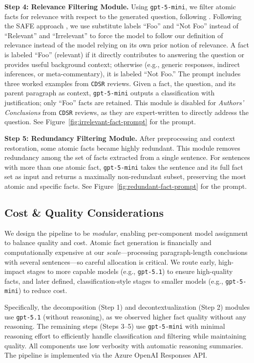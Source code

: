\documentclass{article}
\newcommand{\xhdr}[1]{%
  \noindent\textbf{#1.}
}
\begin{document}
\xhdr{Step 4: Relevance Filtering Module} Using \texttt{gpt-5-mini}, we filter atomic facts for relevance with respect to the generated question, following \cite{liu-etal-2025-verifact, 10.5555/3737916.3740483}. Following the SAFE approach \cite{10.5555/3737916.3740483}, we use substitute labels ``Foo'' and ``Not Foo'' instead of ``Relevant'' and ``Irrelevant'' to force the model to follow our definition of relevance instead of the model relying on its own prior notion of relevance. A fact is labeled ``Foo'' (relevant) if it directly contributes to answering the question or provides useful background context; otherwise (e.g., generic responses, indirect inferences, or meta-commentary), it is labeled ``Not Foo.'' The prompt includes three worked examples from \texttt{CDSR} reviews. Given a fact, the question, and its parent paragraph as context, \texttt{gpt-5-mini} outputs a classification with justification; only ``Foo'' facts are retained. This module is disabled for \textit{Authors’ Conclusions} from \texttt{CDSR} reviews, as they are expert-written to directly address the question. See Figure~\ref{fig:irrelevant-fact-prompt} for the prompt.


\xhdr{Step 5: Redundancy Filtering Module} After preprocessing and context restoration, some atomic facts became highly redundant. This module removes redundancy among the set of facts extracted from a single sentence. For sentences with more than one atomic fact, \texttt{gpt-5-mini} takes the sentence and its full fact set as input and returns a maximally non-redundant subset, preserving the most atomic and specific facts. See Figure~\ref{fig:redundant-fact-prompt} for the prompt.

\subsection{Cost \& Quality Considerations}\label{appendix:afg-cost}

We design the pipeline to be \textit{modular}, enabling per-component model assignment to balance quality and cost. Atomic fact generation is financially and computationally expensive at our \textit{scale}---processing paragraph-length conclusions with several sentences---so careful allocation is critical. We route early, high-impact stages to more capable models (e.g., \texttt{gpt-5.1}) to ensure high-quality facts, and later defined, classification-style stages to smaller models (e.g., \texttt{gpt-5-mini}) to reduce cost.

Specifically, the decomposition (Step 1) and decontextualization (Step 2) modules use \texttt{gpt-5.1} (without reasoning), as we observed higher fact quality without any reasoning. The remaining steps (Steps 3–5) use \texttt{gpt-5-mini} with minimal reasoning effort to efficiently handle classification and filtering while maintaining quality. All components use low verbosity with automatic reasoning summaries. The pipeline is implemented via the Azure OpenAI Responses API.
\end{document}
